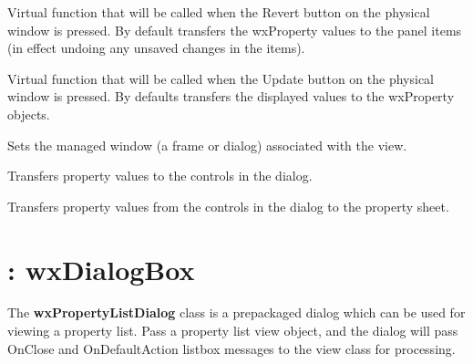 \label{wxpropertyformviewonrevert}


Virtual function that will be called when the Revert button on the physical window is pressed.
By default transfers the wxProperty values to the panel items (in effect
undoing any unsaved changes in the items).

\label{wxpropertyformviewonupdate}


Virtual function that will be called when the Update button on the physical window is pressed.
By defaults transfers the displayed values to the wxProperty objects.

\label{wxpropertyformviewsetmanagedwindow}


Sets the managed window (a frame or dialog) associated with the view.

\label{wxpropertyformviewtransfertodialog}


Transfers property values to the controls in the dialog.

\label{wxpropertyformviewtransfertopropertysheet}


Transfers property values from the controls in the dialog to the property sheet.


\section{: wxDialogBox}\label{wxpropertylistdialog}

The {\bf wxPropertyListDialog} class is a prepackaged dialog which can
be used for viewing a property list. Pass a property list view object, and the dialog
will pass OnClose and OnDefaultAction listbox messages to the view class for
processing.



